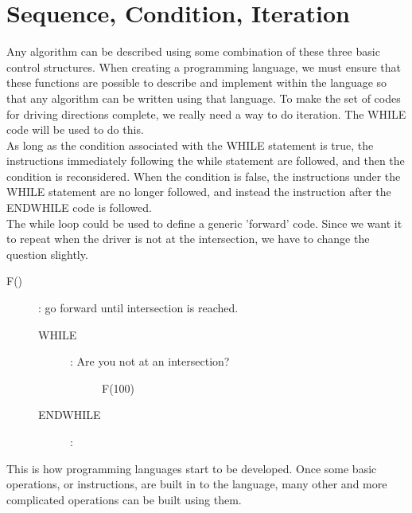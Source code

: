 \section{Sequence, Condition, Iteration}

Any algorithm can be described using some combination of these three basic control structures. When creating a programming language, we must ensure that these functions are possible to describe and implement within the language so that any algorithm can be written using that language. To make the set of codes for driving directions complete, we really need a way to do iteration. The WHILE code will be used to do this.\\

As long as the condition associated with the WHILE statement is true, the instructions immediately following the while statement are followed, and then the condition is reconsidered. When the condition is false, the instructions under the WHILE statement are no longer followed, and instead the instruction after the ENDWHILE code is followed.\\

The while loop could be used to define a generic 'forward' code. Since we want it to repeat when the driver is not at the intersection, we have to change the question slightly.\\

\begin{description}
	\item[F()] : go forward until intersection is reached.
	\begin{description}
		\item[WHILE]: Are you not at an intersection?
		\begin{description}
			\item[] F(100)
		\end{description}
		\item[ENDWHILE]:
	\end{description}
\end{description}

This is how programming languages start to be developed. Once some basic operations, or instructions, are built in to the language, many other and more complicated operations can be built using them.